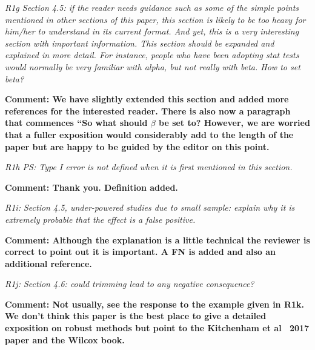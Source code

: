 \documentclass[preprint,10pt]{elsarticle}
\newcommand{\RED}{\color{red}}
\newcommand{\BLACK}{\color{black}}
\begin{document}
{\em R1g Section 4.5: if the reader needs guidance such as some of the simple points mentioned in other sections of this paper, this section is likely to be too heavy for him/her to understand in its current format. And yet, this is a very interesting section with important information. This section should be expanded and explained in more detail. For instance, people who have been adopting stat tests would normally be very familiar with alpha, but not really with beta. How to set beta?}

{\bf Comment: We have slightly extended this section and added more references for the interested reader.  There is also now a paragraph that commences ``So what should $\beta$ be set to? However, we are worried that a fuller exposition would considerably add to the length of the paper but are happy to be guided by the editor on this point.
}

{\em R1h PS: Type I error is not defined when it is first mentioned in this section. }

{\bf Comment: Thank you.  Definition added.
}




{\em R1i: Section 4.5, under-powered studies due to small sample: explain why it is extremely probable that the effect is a false positive. }

{\bf Comment: Although the explanation is a little technical the reviewer is correct to point out it is important.  A FN is added and also an additional reference.}


{\em R1j:  Section 4.6: could trimming lead to any negative consequence?}

{\bf Comment: Not usually, see the response to the example given in R1k. We don't think this paper is the best place to give a detailed exposition on robust methods but point to the Kitchenham et al~ 2017 paper and the Wilcox book.
}
\end{document}
